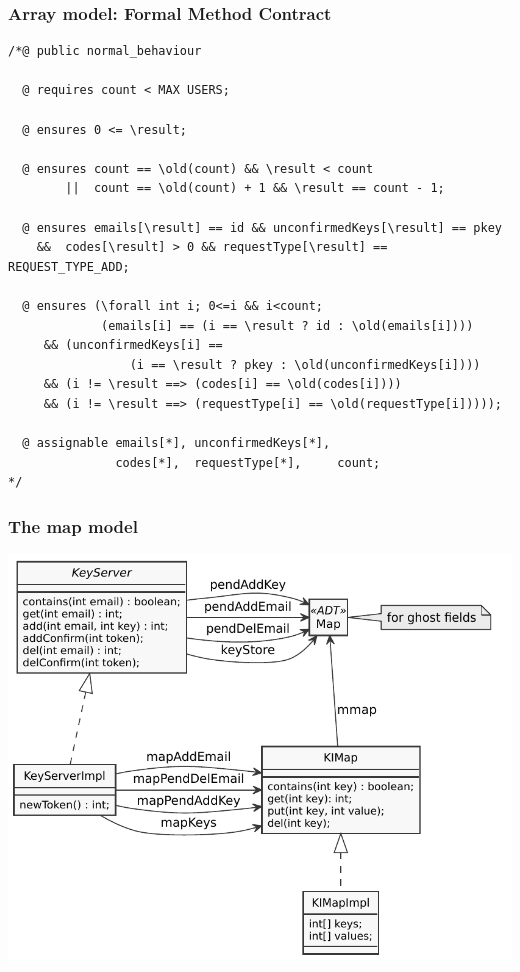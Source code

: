 \documentclass{beamer}
\begin{document}
\begin{frame}[fragile]
    \frametitle{Array model: Formal Method Contract}
    \vspace{-1em}
    \begin{exampleblock}{}
    \vspace{-.5em}
\begin{lstlisting}
/*@ public normal_behaviour

  @ requires count < MAX USERS;
  
  @ ensures 0 <= \result;

  @ ensures count == \old(count) && \result < count
        ||  count == \old(count) + 1 && \result == count - 1;

  @ ensures emails[\result] == id && unconfirmedKeys[\result] == pkey
    &&  codes[\result] > 0 && requestType[\result] == REQUEST_TYPE_ADD;

  @ ensures (\forall int i; 0<=i && i<count;
             (emails[i] == (i == \result ? id : \old(emails[i])))
     && (unconfirmedKeys[i] ==
                 (i == \result ? pkey : \old(unconfirmedKeys[i])))
     && (i != \result ==> (codes[i] == \old(codes[i])))
     && (i != \result ==> (requestType[i] == \old(requestType[i]))));

  @ assignable emails[*], unconfirmedKeys[*],
               codes[*],  requestType[*],     count;
*/
\end{lstlisting}
\end{exampleblock}
\end{frame}



\lstset {
  basicstyle=\footnotesize\ttfamily,
}

\begin{frame}
  \frametitle{The map model}
  \centering  \includegraphics[height=.9\textheight]{imap}
\end{frame}
\end{document}
